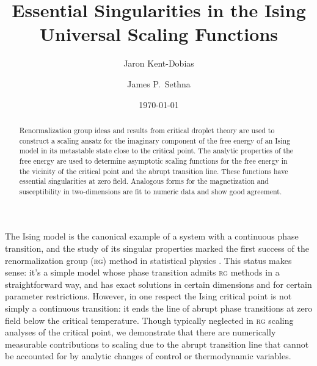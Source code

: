 \documentclass[aps,prl,preprint]{revtex4-1}
\begin{document}
\title{Essential Singularities in the Ising Universal Scaling Functions}
\author{Jaron Kent-Dobias}
\author{James P.~Sethna}

\date\today

\begin{abstract}
  Renormalization group ideas and results from critical droplet theory are
  used to construct a scaling ansatz for the imaginary component of the free
  energy of an Ising model in its metastable state close to the critical
  point. The analytic properties of the free energy are used to determine
  asymptotic scaling functions for the free energy in the vicinity of the
  critical point and the abrupt transition line. These functions have
  essential singularities at zero field. Analogous forms for the magnetization
  and susceptibility in two-dimensions are fit to numeric data and show good
  agreement.
\end{abstract}

\maketitle

The Ising model is the canonical example of a system with a continuous phase
transition, and the study of its singular properties marked the first success
of the renormalization group (\textsc{rg}) method in statistical physics
\cite{wilson.1971.renormalization}. This status makes sense: it's a simple
model whose phase transition admits \textsc{rg} methods in a straightforward way,
and has exact solutions in certain dimensions and for certain parameter
restrictions. However, in one respect the Ising critical point is not simply a
continuous transition: it ends the line of abrupt phase transitions at zero
field below the critical temperature. Though typically neglected in \textsc{rg}
scaling analyses of the critical point, we demonstrate that there are
numerically measurable contributions to scaling due to the abrupt transition
line that cannot be accounted for by analytic changes of control or
thermodynamic variables.
\end{document}
